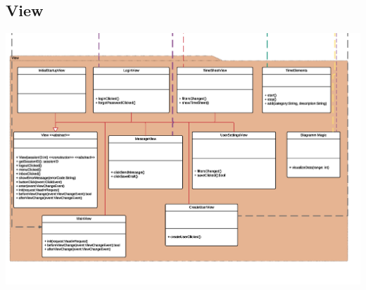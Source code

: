     \subsection{View}
    \includegraphics[width=\linewidth]{Diagramms/class/view.pdf}\\
    \newpage
